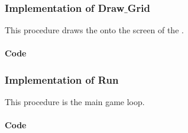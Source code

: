 \subsubsection{Implementation of Draw$\_$Grid}

This procedure draws the \grid onto the screen of the \stmdb.

\paragraph{Code}
\noindent
\begin{centering}

\end{centering}

\subsubsection{Implementation of Run}

This procedure is the main game loop.

\paragraph{Code}
\begin{centering}

\end{centering}
\newpage
